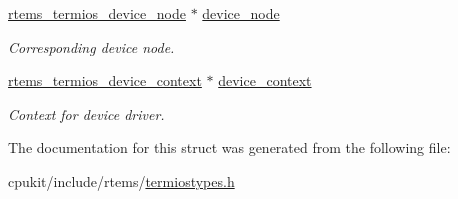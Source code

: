 \begin{DoxyCompactItemize}
\mbox{\hyperlink{structrtems__termios__device__node}{rtems\+\_\+termios\+\_\+device\+\_\+node}} $\ast$ \mbox{\hyperlink{structrtems__termios__tty_adcff5f4359c15747063692056be5eed6}{device\+\_\+node}}
\begin{DoxyCompactList}\small\item\em Corresponding device node. \end{DoxyCompactList}\item 
\mbox{\label{structrtems__termios__tty_af725750be4a082b5b4b565ef0d072083}} 
\mbox{\hyperlink{structrtems__termios__device__context}{rtems\+\_\+termios\+\_\+device\+\_\+context}} $\ast$ \mbox{\hyperlink{structrtems__termios__tty_af725750be4a082b5b4b565ef0d072083}{device\+\_\+context}}
\begin{DoxyCompactList}\small\item\em Context for device driver. \end{DoxyCompactList}\end{DoxyCompactItemize}


The documentation for this struct was generated from the following file\+:\begin{DoxyCompactItemize}
\item 
cpukit/include/rtems/\mbox{\hyperlink{termiostypes_8h}{termiostypes.\+h}}\end{DoxyCompactItemize}
